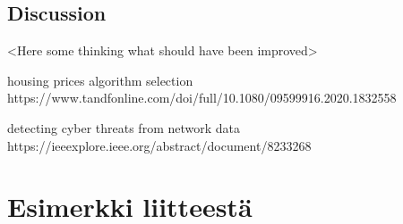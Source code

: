 \documentclass[english, 12pt, a4paper, elec, utf8, a-1b, online]{aaltothesis}
\begin{document}
\subsection{Discussion}
<Here some thinking what should have been improved>

\clearpage

\thesisbibliography

\begin{thebibliography}{99}


  housing prices algorithm selection
  https://www.tandfonline.com/doi/full/10.1080/09599916.2020.1832558

  detecting cyber threats from network data
  https://ieeexplore.ieee.org/abstract/document/8233268


\end{thebibliography}

\clearpage

\thesisappendix

\section{Esimerkki liitteestä\label{LiiteA}}


\clearpage
\end{document}
